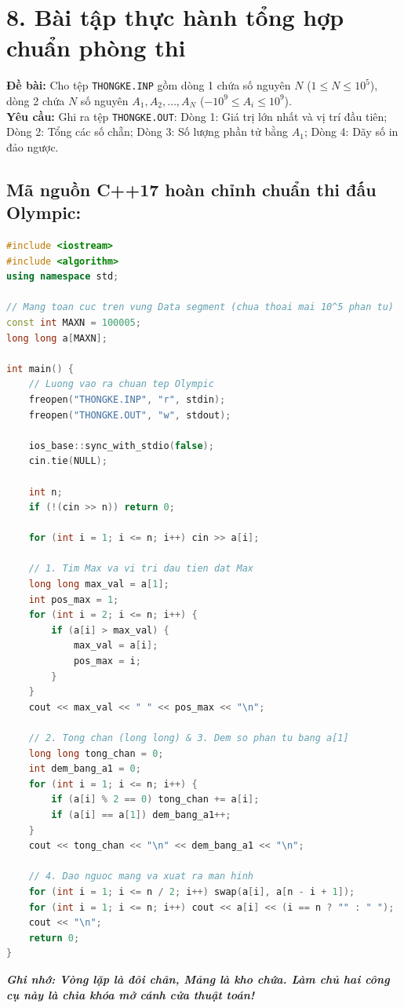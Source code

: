 \documentclass[11pt,a4paper]{article}
\begin{document}
\newpage
\section*{\color{AsianDarkBlue}\normalsize 8. Bài tập thực hành tổng hợp chuẩn phòng thi}

\begin{tcolorbox}[colback=white,colframe=AsianDarkBlue,arc=1.5mm,title=\textbf{\small BÀI TOÁN: THỐNG KÊ DÃY SỐ (THONGKE.INP / THONGKE.OUT)}]
\footnotesize
\textbf{Đề bài:} Cho tệp \texttt{THONGKE.INP} gồm dòng 1 chứa số nguyên $N$ ($1 \le N \le 10^5$), dòng 2 chứa $N$ số nguyên $A_1, A_2, \dots, A_N$ ($-10^9 \le A_i \le 10^9$).\\
\textbf{Yêu cầu:} Ghi ra tệp \texttt{THONGKE.OUT}:
Dòng 1: Giá trị lớn nhất và vị trí đầu tiên; Dòng 2: Tổng các số chẵn; Dòng 3: Số lượng phần tử bằng $A_1$; Dòng 4: Dãy số in đảo ngược.
\end{tcolorbox}

\subsection*{\color{AsianBlue}\small Mã nguồn C++17 hoàn chỉnh chuẩn thi đấu Olympic:}
\begin{lstlisting}[language=C++]
#include <iostream>
#include <algorithm>
using namespace std;

// Mang toan cuc tren vung Data segment (chua thoai mai 10^5 phan tu)
const int MAXN = 100005;
long long a[MAXN];

int main() {
    // Luong vao ra chuan tep Olympic
    freopen("THONGKE.INP", "r", stdin);
    freopen("THONGKE.OUT", "w", stdout);

    ios_base::sync_with_stdio(false);
    cin.tie(NULL);

    int n;
    if (!(cin >> n)) return 0;

    for (int i = 1; i <= n; i++) cin >> a[i];

    // 1. Tim Max va vi tri dau tien dat Max
    long long max_val = a[1];
    int pos_max = 1;
    for (int i = 2; i <= n; i++) {
        if (a[i] > max_val) {
            max_val = a[i];
            pos_max = i;
        }
    }
    cout << max_val << " " << pos_max << "\n";

    // 2. Tong chan (long long) & 3. Dem so phan tu bang a[1]
    long long tong_chan = 0;
    int dem_bang_a1 = 0;
    for (int i = 1; i <= n; i++) {
        if (a[i] % 2 == 0) tong_chan += a[i];
        if (a[i] == a[1]) dem_bang_a1++;
    }
    cout << tong_chan << "\n" << dem_bang_a1 << "\n";

    // 4. Dao nguoc mang va xuat ra man hinh
    for (int i = 1; i <= n / 2; i++) swap(a[i], a[n - i + 1]);
    for (int i = 1; i <= n; i++) cout << a[i] << (i == n ? "" : " ");
    cout << "\n";
    return 0;
}
\end{lstlisting}

\vspace{0.1cm}
\begin{center}
    \textit{\color{AsianDarkBlue}\textbf{Ghi nhớ: Vòng lặp là đôi chân, Mảng là kho chứa. Làm chủ hai công cụ này là chìa khóa mở cánh cửa thuật toán!}}
\end{center}
\end{document}
